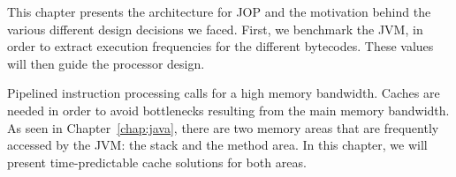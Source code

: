 This chapter presents the architecture for JOP and the motivation
behind the various different design decisions we faced. First, we
benchmark the JVM, in order to extract execution frequencies for the
different bytecodes. These values will then guide the processor
design.

Pipelined instruction processing calls for a high memory bandwidth.
Caches are needed in order to avoid bottlenecks resulting from the
main memory bandwidth. As seen in Chapter~\ref{chap:java}, there are
two memory areas that are frequently accessed by the JVM: the stack
and the method area. In this chapter, we will present
time-predictable cache solutions for both areas.
